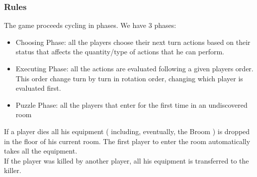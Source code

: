 \subsubsection{Rules}
The game proceeds cycling in phases. We have 3 phases:
\begin{itemize}
\item Choosing Phase: all the players choose their next turn actions based on their status that affects the quantity/type of actions that he can perform.
\item Executing Phase: all the actions are evaluated following a given players order. This order change turn by turn in rotation order, changing which player is evaluated first.
\item Puzzle Phase: all the players that enter for the first time in an undiscovered room 
\end{itemize}
If a player dies all his equipment ( including, eventually, the Broom ) is dropped in the floor of his current room. The first player to enter the room automatically takes all the equipment. \\
If the player was killed by another player, all his equipment is transferred to the killer. \\
 